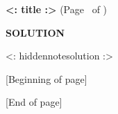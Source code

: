 % 
\usepackage{lastpage}




\begin{center}
  \textbf{<: title :>} (Page \thepage\ of \pageref{LastPage})

  \medskip

  \textbf{SOLUTION}

  \medskip

  <: hiddennotesolution :>

  \bigskip

  [Beginning of page]


  [End of page]

\end{center}



